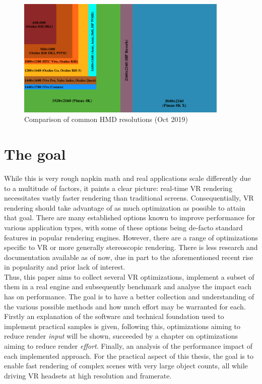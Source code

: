 \begin{figure}[htb]
  \centering
  \includegraphics[width=0.9\textwidth]{pictures/VR_headset_resolution_per_eye_comparison}
  \caption{Comparison of common HMD resolutions (Oct 2019)\cite{VeikkoMakela.2019}} \label{fig:VR_HMD_res}
\end{figure} 

\section{The goal}
While this is very rough napkin math and real applications scale differently due to a multitude of factors, it paints a clear picture: real-time \gls{VR} rendering necessitates vastly faster rendering than traditional screens. Consequentially, \gls{VR} rendering should take advantage of as much optimization as possible to attain that goal. There are many established options known to improve performance for various application types, with some of these options being de-facto standard features in popular rendering engines.  However, there are a range of optimizations specific to \gls{VR} or more generally stereoscopic rendering. There is less research and documentation available as of now, due in part to the aforementioned recent rise in popularity and prior lack of interest. \\
Thus, this paper aims to collect several \gls{VR} optimizations, implement a subset of them in a real engine and subsequently benchmark and analyse the impact each has on performance. The goal is to have a better collection and understanding of the various possible methods and how much effort may be warranted for each. 
Firstly an explanation of the software and technical foundation used to implement practical samples is given, following this, optimizations aiming to reduce render \textit{input} will be shown, succeeded by a chapter on optimizations aiming to reduce render \textit{effort}. Finally, an analysis of the performance impact of each implemented approach. 
For the practical aspect of this thesis, the goal is to enable fast rendering of complex scenes with very large object counts, all while driving \gls{VR} headsets at high resolution and framerate. 

